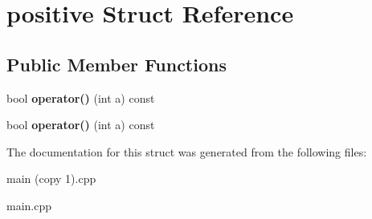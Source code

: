 \hypertarget{structpositive}{}\section{positive Struct Reference}
\label{structpositive}
\subsection*{Public Member Functions}
\begin{DoxyCompactItemize}
\item 
\mbox{\label{structpositive_ae45bf24f6852f816067ada512d4d722a}} 
bool {\bfseries operator()} (int a) const
\item 
\mbox{\label{structpositive_ae45bf24f6852f816067ada512d4d722a}} 
bool {\bfseries operator()} (int a) const
\end{DoxyCompactItemize}


The documentation for this struct was generated from the following files\+:\begin{DoxyCompactItemize}
\item 
main (copy 1).\+cpp\item 
main.\+cpp\end{DoxyCompactItemize}
